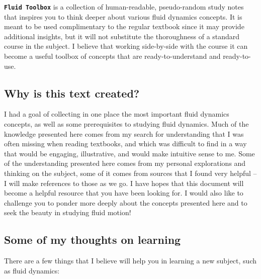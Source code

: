 \documentclass[12pt]{report}
\begin{document}


\texttt{\textbf{Fluid Toolbox}} is a collection of human-readable, pseudo-random study notes that inspires you to think deeper about various fluid dynamics concepts. It is meant to be used complimentary to the regular textbook since it may provide additional insights, but it will not substitute the thoroughness of a standard course in the subject. I believe that working side-by-side with the course it can become a useful toolbox of concepts that are ready-to-understand and ready-to-use.

\subsection*{Why is this text created?}

I had a goal of collecting in one place the most important fluid dynamics concepts, as well as some prerequisites to studying fluid dynamics. Much of the knowledge presented here comes from my search for understanding that I was often missing when reading textbooks, and which was difficult to find in a way that would be engaging, illustrative, and would make intuitive sense to me. Some of the understanding presented here comes from my personal explorations and thinking on the subject, some of it comes from sources that I found very helpful -- I will make references to those as we go. I have hopes that this document will become a helpful resource that you have been looking for. I would also like to challenge you to ponder more deeply about the concepts presented here and to seek the beauty in studying fluid motion!

\subsection*{Some of my thoughts on learning}

There are a few things that I believe will help you in learning a new subject, such as fluid dynamics:
\end{document}
